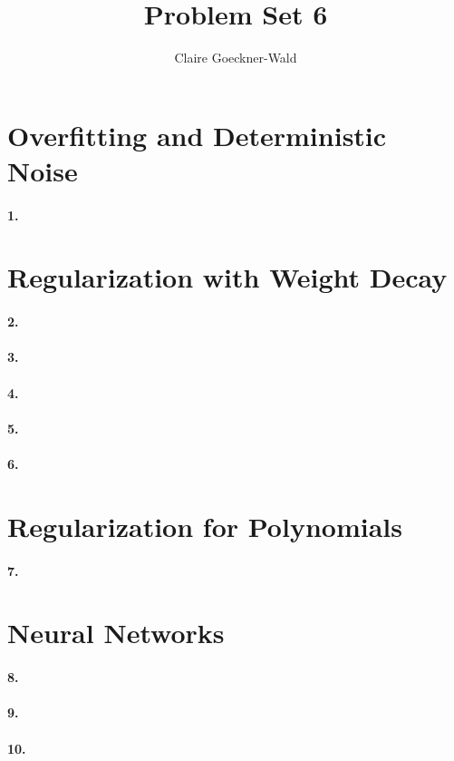 \documentclass[10pt,letter]{article}
\begin{document}
\title{Problem Set 6}
\author{Claire Goeckner-Wald}
\maketitle 

\section*{Overfitting and Deterministic Noise}

\paragraph{1.}

\section*{Regularization with Weight Decay}

\paragraph{2.}

\paragraph{3.}

\paragraph{4.}

\paragraph{5.}

\paragraph{6.}

\section*{Regularization for Polynomials}

\paragraph{7.}

\section*{Neural Networks}

\paragraph{8.}

\paragraph{9.}

\paragraph{10.}
\end{document}
